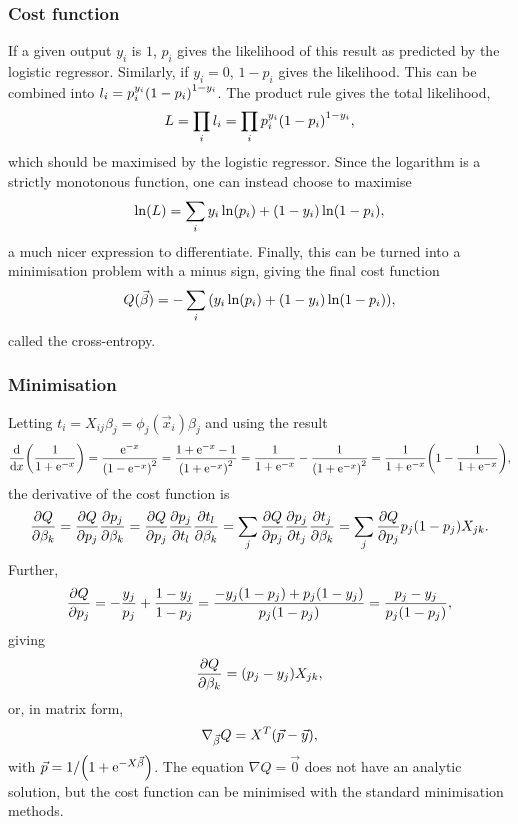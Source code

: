 \documentclass[11pt,british,a4paper]{article}
\renewcommand{\exp}[1]{\mathrm{e}^{#1}}
\numberwithin{equation}{section}
\begin{document}
\subsubsection{Cost function}
If a given output \(y_i\) is \(1\), \(p_i\) gives the likelihood of this result as predicted by the logistic regressor. Similarly, if \(y_i=0\), \(1-p_i\) gives the likelihood. This can be combined into \(l_i = p_i^{y_i} \qty(1-p_i)^{1-y_i}\). The product rule gives the total likelihood,
\begin{equation}
    L = \prod_{i} l_i = \prod_{i} p_i^{y_i} \qty(1-p_i)^{1-y_i},
\end{equation}
which should be maximised by the logistic regressor. Since the logarithm is a strictly monotonous function, one can instead choose to maximise
\begin{equation}
    \ln(L) = \sum_i y_i \ln(p_i) + \qty(1-y_i)\ln(1-p_i),
\end{equation}
a much nicer expression to differentiate. Finally, this can be turned into a minimisation problem with a minus sign, giving the final cost function
\begin{equation}
    Q(\vec{\beta}) = -\sum_i \qty(y_i\ln(p_i) + \qty(1-y_i)\ln(1-p_i)),
\end{equation}
called the cross-entropy.

\subsubsection{Minimisation}
Letting \(t_i=X_{ij}\beta_j = \phi_j(\vec{x}_i)\beta_j\) and using the result
\begin{equation}
    \dv{x}(\frac{1}{1+\exp{-x}}) = \frac{\exp{-x}}{\qty(1-\exp{-x})^2}
                                 = \frac{1 + \exp{-x} - 1}{\qty(1+\exp{-x})^2}
                                 = \frac{1}{1+\exp{-x}} - \frac{1}{\qty(1+\exp{-x})^2}
                                 = \frac{1}{1+\exp{-x}}\qty(1 - \frac{1}{1+\exp{-x}}),
\end{equation}
the derivative of the cost function is
\begin{equation}
    \pdv{Q}{\beta_k} = \pdv{Q}{p_j}\pdv{p_j}{\beta_k}
                     = \pdv{Q}{p_j}\pdv{p_j}{t_l}\pdv{t_l}{\beta_k}
                     = \sum_j \pdv{Q}{p_j}\pdv{p_j}{t_j}\pdv{t_j}{\beta_k}
                     = \sum_j \pdv{Q}{p_j}p_j\qty(1-p_j)X_{jk}.
\end{equation}
Further,
\begin{equation}
    \pdv{Q}{p_j} = - \frac{y_j}{p_j} + \frac{1-y_j}{1-p_j}
                 = \frac{-y_j\qty(1-p_j) + p_j\qty(1-y_j)}{p_j\qty(1-p_j)}
                 = \frac{p_j - y_j}{p_j\qty(1-p_j)},
\end{equation}
giving
\begin{equation}
    \pdv{Q}{\beta_k} = \qty(p_j - y_j) X_{jk},
\end{equation}
or, in matrix form,
\begin{equation}
    \nabla_{\vec{\beta}} Q = X^T \qty(\vec{p} - \vec{y}),
\end{equation}
with \(\vec{p} = 1/\qty(1+\exp{-X\vec{\beta}})\).
The equation \(\nabla Q = \vec{0}\) does not have an analytic solution, but the cost function can be minimised with the standard minimisation methods.
\end{document}
